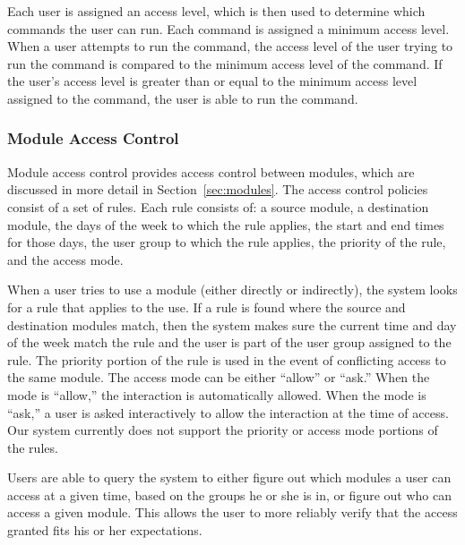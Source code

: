 Each user is assigned an access level, which is then used to determine which
commands the user can run. Each command is assigned a minimum access level.
When a user attempts to run the command, the access level of the user trying to
run the command is compared to the minimum access level of the command. If the
user's access level is greater than or equal to the minimum access level
assigned to the command, the user is able to run the command.
\subsubsection{Module Access Control}
Module access control provides access control between modules, which are
discussed in more detail in Section~\ref{sec:modules}. The access control
policies consist of a set of rules. Each rule consists of: a source module, a
destination module, the days of the week to which the rule applies, the start
and end times for those days, the user group to which the rule applies, the
priority of the rule, and the access mode.

When a user tries to use a module (either directly or indirectly), the system
looks for a rule that applies to the use. If a rule is found where the source
and destination modules match, then the system makes sure the current time and
day of the week match the rule and the user is part of the user group assigned
to the rule. The priority portion of the rule is used in the event of
conflicting access to the same module. The access mode can be either ``allow''
or ``ask.'' When the mode is ``allow,'' the interaction is automatically
allowed. When the mode is ``ask,'' a user is asked interactively to allow the
interaction at the time of access. Our system currently does not support the
priority or access mode portions of the rules.

Users are able to query the system to either figure out which modules a user can
access at a given time, based on the groups he or she is in, or figure out who
can access a given module. This allows the user to more reliably verify that the
access granted fits his or her expectations.
